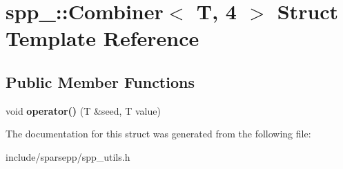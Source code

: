 \hypertarget{structspp___1_1_combiner_3_01_t_00_014_01_4}{}\section{spp\+\_\+\+:\+:Combiner$<$ T, 4 $>$ Struct Template Reference}
\label{structspp___1_1_combiner_3_01_t_00_014_01_4}
\subsection*{Public Member Functions}
\begin{DoxyCompactItemize}
\item 
void {\bfseries operator()} (T \&seed, T value)\hypertarget{structspp___1_1_combiner_3_01_t_00_014_01_4_aeacf87124749fd2f7269e8e04dcb410a}{}\label{structspp___1_1_combiner_3_01_t_00_014_01_4_aeacf87124749fd2f7269e8e04dcb410a}

\end{DoxyCompactItemize}


The documentation for this struct was generated from the following file\+:\begin{DoxyCompactItemize}
\item 
include/sparsepp/spp\+\_\+utils.\+h\end{DoxyCompactItemize}
